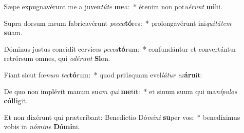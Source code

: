\item Sæpe expugnavérunt me a juven\textit{tú}\textit{te} \textbf{me}a:~* étenim non pot\textit{u}\textit{é}\textit{runt} \textbf{mi}hi.
\item Supra dorsum meum fabricavérunt \textit{pec}\textit{ca}\textbf{tó}res:~* prolongavérunt ini\textit{qui}\textit{tá}\textit{tem} \textbf{su}am.
\item Dóminus justus concídit cervíces \textit{pec}\textit{ca}\textbf{tó}rum:~* confundántur et convertántur retrórsum omnes, qui \textit{o}\textit{dé}\textit{runt} \textbf{Si}on.
\item Fiant sicut fœ\textit{num} \textit{tec}\textbf{tó}rum:~* quod priúsquam evel\textit{lá}\textit{tur} \textit{ex}\textbf{á}\textbf{ru}it:
\item De quo non implévit manum su\textit{am} \textit{qui} \textbf{me}tit:~* et sinum suum qui ma\textit{ní}\textit{pu}\textit{los} \textbf{cól}\textbf{li}git.
\item Et non dixérunt qui præteríbant: Benedíctio Dó\textit{mi}\textit{ni} \textbf{su}per vos:~* benedíximus vobis in \textit{nó}\textit{mi}\textit{ne} \textbf{Dó}\textbf{mi}ni.
